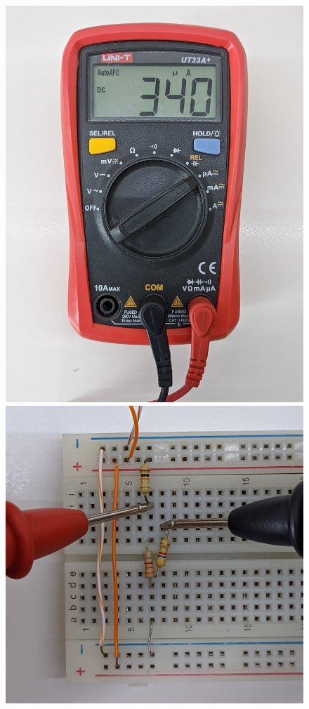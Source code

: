 \documentclass[a4paper,12pt, spanish]{report}
\begin{document}
      \vspace{-0.5cm}
      \begin{figure}[H]
        \centering
          \begin{minipage}{0.3\textwidth}
            \centering
            \includegraphics[width=1\linewidth]{pictures/mult-i2.jpg}
            \includegraphics[width=1\linewidth]{pictures/prot-i2.jpg}

\end{minipage}
\end{figure}
\end{document}
